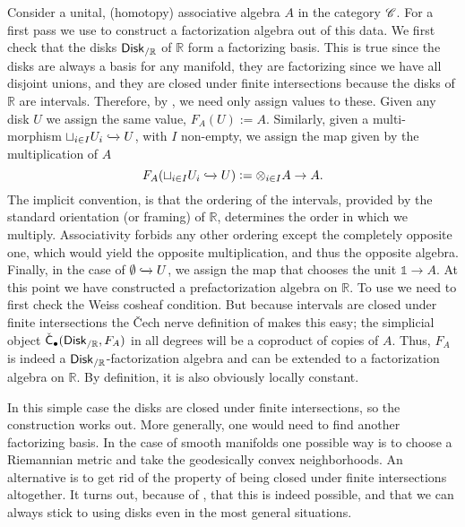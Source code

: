 \documentclass[../text]{subfiles}
\begin{document}
\begin{construction}\label{con:lcfas_on_R}
    Consider a unital, (homotopy) associative algebra $A$ in the category $\mathscr{C}$. For a first pass we use  to construct a factorization algebra out of this data. We first check that the disks $\disk[r]_{/\mathbb{R}}$ of $\mathbb{R}$ form a factorizing basis. This is true since the disks are always a basis for any manifold, they are factorizing since we have all disjoint unions, and they are closed under finite intersections because the disks of $\mathbb{R}$ are intervals. Therefore, by , we need only assign values to these. Given any disk $U$ we assign the same value, $F_A(U) := A$. Similarly, given a multi-morphism $\sqcup_{i \in I} U_i \xhookrightarrow{} U$, with $I$ non-empty, we assign the map given by the multiplication of $A$
    \begin{equation}
        F_A(\sqcup_{i \in I} U_i \xhookrightarrow{} U) := \otimes_{i \in I} A \rightarrow A.
    \end{equation}
    The implicit convention, is that the ordering of the intervals, provided by the standard orientation (or framing) of $\mathbb{R}$, determines the order in which we multiply. Associativity forbids any other ordering except the completely opposite one, which would yield the opposite multiplication, and thus the opposite algebra. Finally, in the case of $\emptyset \xhookrightarrow{} U$, we assign the map that chooses the unit $\mathbb{1} \rightarrow A$. At this point we have constructed a prefactorization algebra on $\mathbb{R}$. To use  we need to first check the Weiss cosheaf condition. But because intervals are closed under finite intersections the \v{C}ech nerve definition of  makes this easy; the simplicial object $\cech_{\bullet}(\disk[r]_{/\mathbb{R}}, F_A)$ in all degrees will be a coproduct of copies of $A$. Thus, $F_A$ is indeed a $\disk[r]_{/\mathbb{R}}$-factorization algebra and can be extended to a factorization algebra on $\mathbb{R}$. By definition, it is also obviously locally constant.

    In this simple case the disks are closed under finite intersections, so the construction works out. More generally, one would need to find another factorizing basis. In the case of smooth manifolds one possible way is to choose a Riemannian metric and take the geodesically convex neighborhoods. An alternative is to get rid of the property of being closed under finite intersections altogether. It turns out, because of , that this is indeed possible, and that we can always stick to using disks even in the most general situations.


\end{construction}
\end{document}
